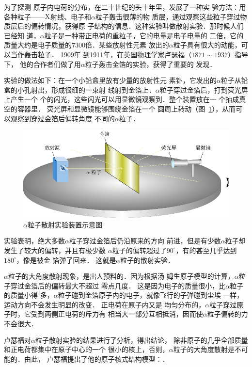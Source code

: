 为了探测
原子内电荷的分布，在二十世纪的头十年里，发展了一种实
验方法：用各种粒子——$\rm{X}$射线、电子和$\alpha$粒子轰击很薄的物
质层，通过观察这些粒子穿过物质层后的偏转情况，获得原
子结构的信息．这种实验叫做散射实验．那时候人们已经知
道，$\alpha$粒子是一种带正电荷的重粒子，它的电量是电子电量的
二倍，它的质量大约是电子质量的7300倍．某些放射性元素
放出的$\alpha$粒子具有很大的动能，可以当作轰击粒子．
1909年
到1911年，在英国物理学家卢瑟福（$1871 \sim 1937$）指导下，
他的合作者们做了用$\alpha$粒子轰击金箔的实验，获得了重要的
发现．

实验的做法如下：在一个小铅盒里放有少量的放射性元
素钋，它发出的$\alpha$粒子从铅盒的小孔射出，形成很细的一束射
线射到金箔上．$\alpha$粒子穿过金箔后，打到荧光屏上产生一个
个的闪光，这些闪光可以用显微镜观察到．整个装置放在一
个抽成真空的容器里．
荧光屏和显微镜能够围绕金箔在一个
圆周上转动（图~\ref{fig_C_8-2}），从而可以观察到穿过金箔后偏转角度
不同的$\alpha$粒子．
\begin{figure}[htbp]
    \centering
    \includegraphics{fig/C/8-2.pdf}
    \caption{$\alpha$粒子散射实验装置示意图}\label{fig_C_8-2}
\end{figure}

实验表明，绝大多数$\alpha$粒子穿过金箔后仍沿原来的方向
前进，但是有少数$\alpha$粒子却发生了较大的偏转，并且有极少数
$\alpha$粒子的偏转超过了$90^{\circ}$，有的甚至几乎达到$180^{\circ}$，像是被金
箔弹了回来．
这就是$\alpha$粒子的散射实验．

$\alpha$粒子的大角度散射现象，是出人预料的．因为根据汤
姆生原子模型的计算，$\alpha$粒子穿过金箔后的偏转最大不超过
零点几度．
这是因为电子的质量很小，比$\alpha$粒子的质量小得
多，$\alpha$粒子碰到金箔原子内的电子，就像飞行的子弹碰到尘埃
一样，运动方向不会发生明显的改变．
正电荷在原子内又是
均匀分布的，$\alpha$粒子穿过原子时，它受到两侧正电荷的斥力有
相当大一部分互相抵消，因而使$\alpha$粒子偏转的力不会很大．

卢瑟福对$\alpha$粒子散射实验的结果进行了分析，得出结论，
除非原子的几乎全部质量和正电荷都集中在原子中心的一个
很小的核上，否则，$\alpha$粒子的大角度散射是不可能的．由此，
卢瑟福提出了他的原子核式结构模型：．


